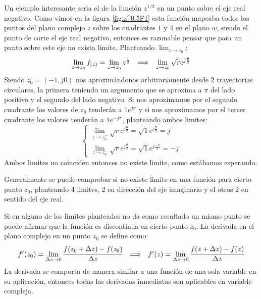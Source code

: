 Un ejemplo interesante seria el de la función $z^{1/2}$ en un punto sobre el eje real negativo. Como vimos en la figura \ref{fig:z^0.5F1} esta función mapeaba todos los puntos del plano complejo $z$ sobre los cuadrantes $1$ y $4$ en el plano $w$, siendo el punto de corte el eje real negativo, entonces es razonable pensar que para un punto sobre este eje no exista limite. Planteando $\lim_{z\to z_0}$:
\begin{equation}
    \lim_{z\to z_0} f_{(z)}=\lim_{z\to z_0}z^{\frac{1}{2}}\hspace{0.25cm} \Longrightarrow \hspace{0.25cm} \lim_{z\to z_0} \sqrt{r}e^{j\frac{\theta}{2}}
\end{equation}
Siendo $z_0=(-1,j0)$ nos aproximándonos arbitrariamente desde 2 trayectorias circulares, la primera teniendo un argumento que se aproxima a $\pi$ del lado positivo y el segundo del lado negativo. Si nos aproximamos por el segundo cuadrante los valores de $z_0$ tenderán a $1e^{j\pi}$ y si nos aproximamos por el tercer cuadrante los valores tenderán a $1e^{-j\pi}$, planteando ambos limites:
\begin{equation}
    \begin{cases}
        \lim_{z\to z_0^{+}} \sqrt{r}e^{j\frac{\theta}{2}}=\sqrt{1}e^{j\frac{\pi}{2}}=j\\
        \lim_{z\to z_0^{-}} \sqrt{r}e^{j\frac{\theta}{2}}=\sqrt{1}e^{j\frac{-\pi}{2}}=-j
    \end{cases}
\end{equation}
Ambos limites no coinciden entonces no existe limite, como estábamos esperando.
\begin{figure}[H]
    \centering
    
    \caption{}
\end{figure}
Generalmente se puede comprobar si no existe limite en una función para cierto punto $z_0$, planteando 4 limites, 2 en dirección del eje imaginario y el otros 2 en sentido del eje real.
\begin{figure}[H]
    \centering
    
    \caption{}
\end{figure}
Si en alguno de los limites planteados no da como resultado un mismo punto se puede afirmar que la función es discontinua en cierto punto $z_0$.
La derivada en el plano complejo en un punto $z_0$ se define como:
\begin{equation}
    f'(z_0)=\lim_{\Delta z\to 0}\cfrac{f(z_0+\Delta z)-f(z_0)}{\Delta z}\hspace{0.25cm} \Longrightarrow \hspace{0.25cm} f'(z)=\lim_{\Delta z\to 0}\cfrac{f(z+\Delta z)-f(z)}{\Delta z}
    \label{eq:Defder}
\end{equation}
La derivada se comporta de manera similar a una función de una sola variable en su aplicación, entonces todas las derivadas inmediatas son aplicables en variable compleja. 

